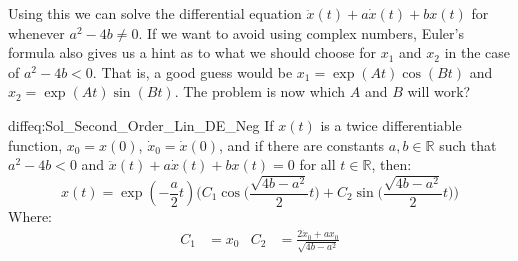             Using this we can solve the differential equation
            $\ddot{x}(t)+a\dot{x}(t)+bx(t)$ for whenever
            $a^{2}-4b\ne{0}$. If we want to avoid using
            complex numbers, Euler's formula also gives us a
            hint as to what we should choose for
            $x_{1}$ and $x_{2}$ in the case of
            $a^{2}-4b<0$. That is, a good guess would be
            $x_{1}=\exp(At)\cos(Bt)$ and
            $x_{2}=\exp(At)\sin(Bt)$. The problem is now which
            $A$ and $B$ will work?
            \begin{ftheorem}{}{diffeq:Sol_Second_Order_Lin_DE_Neg}
                If $x(t)$ is a twice differentiable function,
                $x_{0}=x(0)$, $\dot{x}_{0}=\dot{x}(0)$, and if
                there are constants $a,b\in\mathbb{R}$ such that
                $a^{2}-4b<0$ and
                $\ddot{x}(t)+a\dot{x}(t)+bx(t)=0$ for all
                $t\in\mathbb{R}$, then:
                \begin{equation*}
                    x(t)=\exp(-\frac{a}{2}t)\bigg(
                    C_{1}\cos\Big(\frac{\sqrt{4b-a^{2}}}{2}t\Big)+
                    C_{2}\sin\Big(\frac{\sqrt{4b-a^{2}}}{2}t\Big)
                    \bigg)
                \end{equation*}
                Where:
                \begin{align*}
                    C_{1}&=x_{0}
                    &
                    C_{2}
                    &=\frac{2\dot{x}_{0}
                    +ax_{0}}{\sqrt{4b-a^{2}}}
                \end{align*}
            \end{ftheorem}
